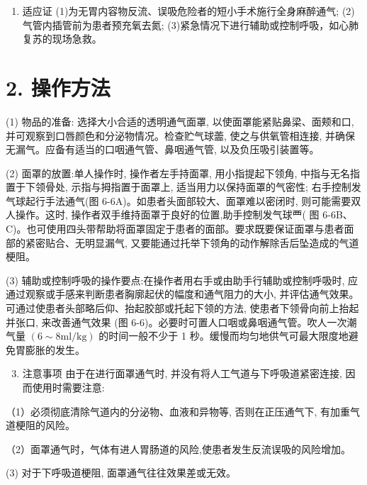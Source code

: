 \documentclass[10pt]{article}
\begin{document}
\begin{enumerate}
  \item 适应证 (1)为无胃内容物反流、误吸危险者的短小手术施行全身麻醉通气; (2)气管内插管前为患者预充氧去氮; (3)紧急情况下进行辅助或控制呼吸，如心肺复苏的现场急救。
\end{enumerate}

\section*{2. 操作方法}
(1) 物品的准备: 选择大小合适的透明通气面罩, 以使面罩能紧贴鼻梁、面颊和口, 并可观察到口唇颜色和分泌物情况。检查贮气球蘦, 使之与供氧管相连接, 并确保无漏气。应备有适当的口咽通气管、鼻咽通气管, 以及负压吸引装置等。

(2) 面罩的放置:单人操作时, 操作者左手持面罩, 用小指提起下领角, 中指与无名指置于下领骨处, 示指与拇指置于面罩上, 适当用力以保持面罩的气密性; 右手控制发气球起行手法通气(图 6-6A)。如患者头面部较大、面罩难以密闭时, 则可能需要双人操作。这时, 操作者双手维持面罩于良好的位置,助手控制发气球覀( 图 6-6B、C)。也可使用四头带帮助将面罩固定于患者的面部。要求既要保证面罩与患者面部的紧密贴合、无明显漏气, 又要能通过托举下领角的动作解除舌后坠造成的气道梗阻。

(3) 辅助或控制呼吸的操作要点:在操作者用右手或由助手行辅助或控制呼吸时, 应通过观察或手感来判断患者胸廓起伏的幅度和通气阻力的大小, 并评估通气效果。可通过使患者头部略后仰、抬起㬵部或托起下领的方法, 使患者下领骨向前上抬起并张口, 来改善通气效果 (图 6-6)。必要时可置人口咽或鼻咽通气管。吹人一次潮气量 $(6 \sim 8 \mathrm{ml} / \mathrm{kg})$ 的时间一般不少于 1 秒。缓慢而均匀地供气可最大限度地避免胃膨胀的发生。

\begin{enumerate}
  \setcounter{enumi}{2}
  \item 注意事项 由于在进行面罩通气时, 并没有将人工气道与下呼吸道紧密连接, 因而使用时需要注意:
\end{enumerate}

（1）必须彻底清除气道内的分泌物、血液和异物等, 否则在正压通气下, 有加重气道梗阻的风险。

（2）面罩通气时，气体有进人胃肠道的风险,使患者发生反流误吸的风险增加。

(3) 对于下呼吸道梗阻, 面罩通气往往效果差或无效。
\end{document}
